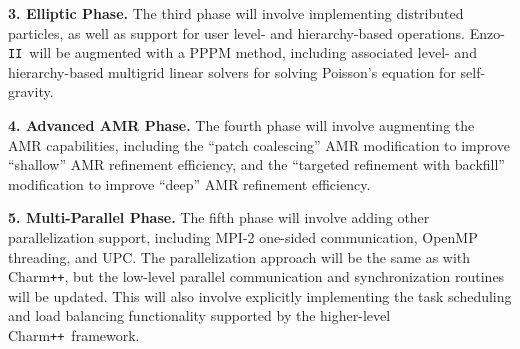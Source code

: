 \documentclass[11pt,letterpaper]{article}
\newcommand{\enzoii}{\textsf{Enzo}-\texttt{II}}
\newcommand{\pp}{\texttt{++}}
\newcommand{\charm}{\textsf{Charm\pp}}
\begin{document}
\textbf{3. Elliptic Phase.}  The third phase will involve implementing
distributed particles, as well as support for user level- and
hierarchy-based operations.  \enzoii\ will be augmented with a PPPM
method, including associated level- and hierarchy-based multigrid
linear solvers for solving Poisson's equation for self-gravity.

\textbf{4. Advanced AMR Phase.} The fourth phase will involve augmenting the
AMR capabilities, including the ``patch coalescing'' AMR modification
to improve ``shallow'' AMR refinement efficiency, and the ``targeted
refinement with backfill'' modification to improve ``deep'' AMR
refinement efficiency.

\textbf{5. Multi-Parallel Phase.}  The fifth phase will involve adding
other parallelization support, including MPI-2 one-sided
communication, OpenMP threading, and UPC.  The parallelization
approach will be the same as with \charm, but the low-level parallel
communication and synchronization routines will be updated.  This will
also involve explicitly implementing the task scheduling and load
balancing functionality supported by the higher-level \charm\
framework.


%
%
\end{document}

